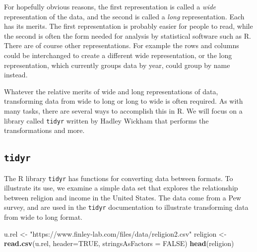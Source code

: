 \documentclass[
]{krantz}
\makeatletter
\newenvironment{Shaded}{\begin{snugshade}}{\end{snugshade}}
\newcommand{\DataTypeTok}[1]{\textcolor[rgb]{0.27,0.27,0.27}{#1}}
\newcommand{\KeywordTok}[1]{\textcolor[rgb]{0.27,0.27,0.27}{\textbf{#1}}}
\newcommand{\NormalTok}[1]{#1}
\newcommand{\OtherTok}[1]{\textcolor[rgb]{0.37,0.37,0.37}{#1}}
\newcommand{\StringTok}[1]{\textcolor[rgb]{0.5,0.5,0.5}{#1}}
\newenvironment{kframe}{%
\medskip{}
\setlength{\fboxsep}{.8em}
 \def\at@end@of@kframe{}%
 \ifinner\ifhmode%
  \def\at@end@of@kframe{\end{minipage}}%
  \begin{minipage}{\columnwidth}%
 \fi\fi%
 \def\FrameCommand##1{\hskip\@totalleftmargin \hskip-\fboxsep
 \colorbox{shadecolor}{##1}\hskip-\fboxsep
     \hskip-\linewidth \hskip-\@totalleftmargin \hskip\columnwidth}%
 \MakeFramed {\advance\hsize-\width
   \@totalleftmargin\z@ \linewidth\hsize
   \@setminipage}}%
 {\par\unskip\endMakeFramed%
 \at@end@of@kframe}
\renewenvironment{Shaded}{\begin{kframe}}{\end{kframe}}
\makeatother
\begin{document}
For hopefully obvious reasons, the first representation is called a \emph{wide} representation of the data, and the second is called a \emph{long} representation. Each has its merits. The first representation is probably easier for people to read, while the second is often the form needed for analysis by statistical software such as R. There are of course other representations. For example the rows and columns could be interchanged to create a different wide representation, or the long representation, which currently groups data by year, could group by name instead.

Whatever the relative merits of wide and long representations of data, transforming data from wide to long or long to wide is often required. As with many tasks, there are several ways to accomplish this in R. We will focus on a library called \texttt{tidyr} written by Hadley Wickham that performs the transformations and more.

\hypertarget{tidyr}{%
\subsection{\texorpdfstring{\texttt{tidyr}}{tidyr}}\label{tidyr}}

The R library \texttt{tidyr} has functions for converting data between formats. To illustrate its use, we examine a simple data set that explores the relationship between religion and income in the United States. The data come from a Pew survey, and are used in the \texttt{tidyr} documentation to illustrate transforming data from wide to long format.

\begin{Shaded}
\begin{Highlighting}[]
\NormalTok{u.rel \textless{}{-}}\StringTok{ "https://www.finley{-}lab.com/files/data/religion2.csv"}
\NormalTok{religion \textless{}{-}}\StringTok{ }\KeywordTok{read.csv}\NormalTok{(u.rel, }\DataTypeTok{header=}\OtherTok{TRUE}\NormalTok{, }\DataTypeTok{stringsAsFactors =} \OtherTok{FALSE}\NormalTok{)}
\KeywordTok{head}\NormalTok{(religion)}
\end{Highlighting}
\end{Shaded}
\end{document}
